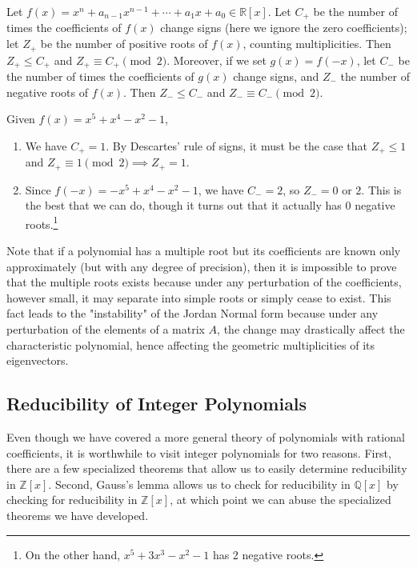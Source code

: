   \begin{theorem} 
    \label{thm:descartes}
    Let $f(x) = x^n + a_{n-1}x^{n-1} + \cdots + a_1x + a_0 \in \mathbb{R}[x]$. Let $C_+$ be the number of times the coefficients of $f(x)$ change signs (here we ignore the zero coefficients); let $Z_+$ be the number of positive roots of $f(x)$, counting multiplicities. Then $Z_+ \leq C_+$ and $Z_+ \equiv C_+ \pmod{2}$. Moreover, if we set $g(x) = f(-x)$, let $C_-$ be the number of times the coefficients of $g(x)$ change signs, and $Z_-$ the number of negative roots of $f(x)$. Then $Z_- \leq C_-$ and $Z_- \equiv C_- \pmod{2}$.
  \end{theorem}

  \begin{example}
    Given $f(x) = x^5 + x^4 - x^2 - 1$, 
    \begin{enumerate}
      \item We have $C_+ = 1$. By Descartes' rule of signs, it must be the case that $Z_+ \leq 1$ and $Z_+ \equiv 1 \pmod{2} \implies Z_+ = 1$. 
      \item Since $f(-x) = -x^5 + x^4 - x^2 - 1$, we have $C_- = 2$, so $Z_- = 0$ or $2$. This is the best that we can do, though it turns out that it actually has $0$ negative roots.\footnote{On the other hand, $x^5 + 3x^3 - x^2 - 1$ has 2 negative roots.} 
    \end{enumerate}
  \end{example}

  Note that if a polynomial has a multiple root but its coefficients are known only approximately (but with any degree of precision), then it is impossible to prove that the multiple roots exists because under any perturbation of the coefficients, however small, it may separate into simple roots or simply cease to exist. This fact leads to the "instability" of the Jordan Normal form because under any perturbation of the elements of a matrix $A$, the change may drastically affect the characteristic polynomial, hence affecting the geometric multiplicities of its eigenvectors. 

\subsection{Reducibility of Integer Polynomials} 

  Even though we have covered a more general theory of polynomials with rational coefficients, it is worthwhile to visit integer polynomials for two reasons. First, there are a few specialized theorems that allow us to easily determine reducibility in $\mathbb{Z}[x]$. Second, Gauss's lemma allows us to check for reducibility in $\mathbb{Q}[x]$ by checking for reducibility in $\mathbb{Z}[x]$, at which point we can abuse the specialized theorems we have developed. 

